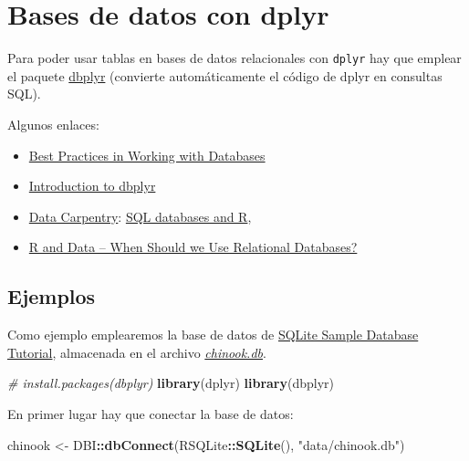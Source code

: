 \documentclass[
]{book}
\newenvironment{Shaded}{\begin{snugshade}}{\end{snugshade}}
\newcommand{\CommentTok}[1]{\textcolor[rgb]{0.56,0.35,0.01}{\textit{#1}}}
\newcommand{\FunctionTok}[1]{\textcolor[rgb]{0.13,0.29,0.53}{\textbf{#1}}}
\newcommand{\NormalTok}[1]{#1}
\newcommand{\OtherTok}[1]{\textcolor[rgb]{0.56,0.35,0.01}{#1}}
\newcommand{\SpecialCharTok}[1]{\textcolor[rgb]{0.81,0.36,0.00}{\textbf{#1}}}
\newcommand{\StringTok}[1]{\textcolor[rgb]{0.31,0.60,0.02}{#1}}
\begin{document}
\hypertarget{dbplyr}{%
\section{Bases de datos con dplyr}\label{dbplyr}}

Para poder usar tablas en bases de datos relacionales con \texttt{dplyr} hay que emplear el paquete \href{https://dbplyr.tidyverse.org}{dbplyr} (convierte automáticamente el código de dplyr en consultas SQL).

Algunos enlaces:

\begin{itemize}
\item
  \href{https://solutions.posit.co/connections/db}{Best Practices in Working with Databases}
\item
  \href{https://dbplyr.tidyverse.org/articles/dbplyr.html}{Introduction to dbplyr}
\item
  \href{https://datacarpentry.org/R-ecology-lesson/index.html}{Data Carpentry}:
  \href{https://datacarpentry.org/R-ecology-lesson/05-r-and-databases.html}{SQL databases and R},
\item
  \href{https://intellixus.com/2018/06/29/r-and-data-when-should-we-use-relational-databases}{R and Data -- When Should we Use Relational Databases?}
\end{itemize}

\hypertarget{ejemplos}{%
\subsection{Ejemplos}\label{ejemplos}}

Como ejemplo emplearemos la base de datos de \href{https://www.sqlitetutorial.net/sqlite-sample-database/}{SQLite Sample Database Tutorial}, almacenada en el archivo \href{data/chinook.db}{\emph{chinook.db}}.

\begin{Shaded}
\begin{Highlighting}[]
\CommentTok{\# install.packages(\textquotesingle{}dbplyr\textquotesingle{})}
\FunctionTok{library}\NormalTok{(dplyr)}
\FunctionTok{library}\NormalTok{(dbplyr)}
\end{Highlighting}
\end{Shaded}

En primer lugar hay que conectar la base de datos:

\begin{Shaded}
\begin{Highlighting}[]
\NormalTok{chinook }\OtherTok{\textless{}{-}}\NormalTok{ DBI}\SpecialCharTok{::}\FunctionTok{dbConnect}\NormalTok{(RSQLite}\SpecialCharTok{::}\FunctionTok{SQLite}\NormalTok{(), }\StringTok{"data/chinook.db"}\NormalTok{)}
\end{Highlighting}
\end{Shaded}
\end{document}

